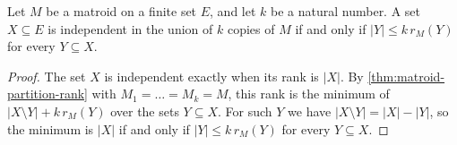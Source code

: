 \begin{theorem}
  \label{thm:matroid-partition}
  \leanok
  Let $M$ be a matroid on a finite set $E$, and let $k$ be a natural
  number. A set $X \subseteq E$ is independent in the union of $k$
  copies of $M$ if and only if $|Y| \le k\, r_M(Y)$ for every
  $Y \subseteq X$.
\end{theorem}
\begin{proof}
  \leanok
  The set $X$ is independent exactly when its rank is $|X|$. By
  \cref{thm:matroid-partition-rank} with $M_1 = \dots = M_k = M$, this
  rank is the minimum of $|X \setminus Y| + k\, r_M(Y)$ over the sets
  $Y \subseteq X$. For such $Y$ we have
  $|X \setminus Y| = |X| - |Y|$, so the minimum is $|X|$ if and only if
  $|Y| \le k\, r_M(Y)$ for every $Y \subseteq X$.
\end{proof}
